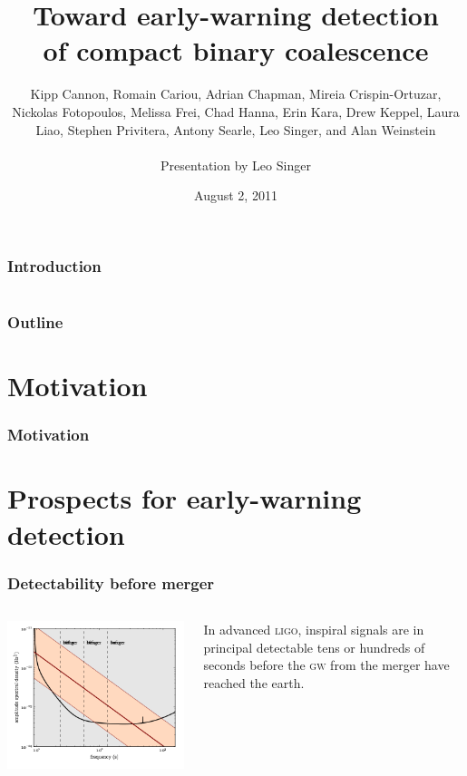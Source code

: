 \documentclass{beamer}
\title[LIGO-Gxxxxxxx-vx]{Toward early-warning detection \\ of compact binary coalescence}
\institute[LIGO Caltech]{LIGO Laboratory, California Institute of Technology}
\author[L Singer]{\footnotesize{
	Kipp Cannon,
	Romain Cariou,
	Adrian Chapman,
	Mireia Crispin-Ortuzar,
	Nickolas Fotopoulos,
	Melissa Frei,
	Chad Hanna,
	Erin Kara,
	Drew Keppel,
	Laura Liao,
	Stephen Privitera,
	Antony Searle,
	Leo Singer, and
	Alan Weinstein} \\~\\ Presentation by Leo Singer}
\date{August 2, 2011}
\begin{document}
\frame{\titlepage}


\begin{frame}
\frametitle{Introduction}
\end{frame}


\section[Outline]{}
\begin{frame}
	\frametitle{Outline}
	\tableofcontents
\end{frame}


\section{Motivation}

\begin{frame}
\frametitle{Motivation}
\end{frame}


\section{Prospects for early-warning detection}

\begin{frame}
	\frametitle{Detectability before merger}
	\begin{columns}
		\begin{column}{0.7\textwidth}
			\includegraphics[width=\textwidth]{figures/snr_psd}
		\end{column}
		\begin{column}{0.3\textwidth}
			In advanced \textsc{ligo}, inspiral signals are in principal detectable {\color{ink3}tens or hundreds of seconds} before the \textsc{gw} from the merger have reached the earth.
		\end{column}
	\end{columns}
\end{frame}
\end{document}
